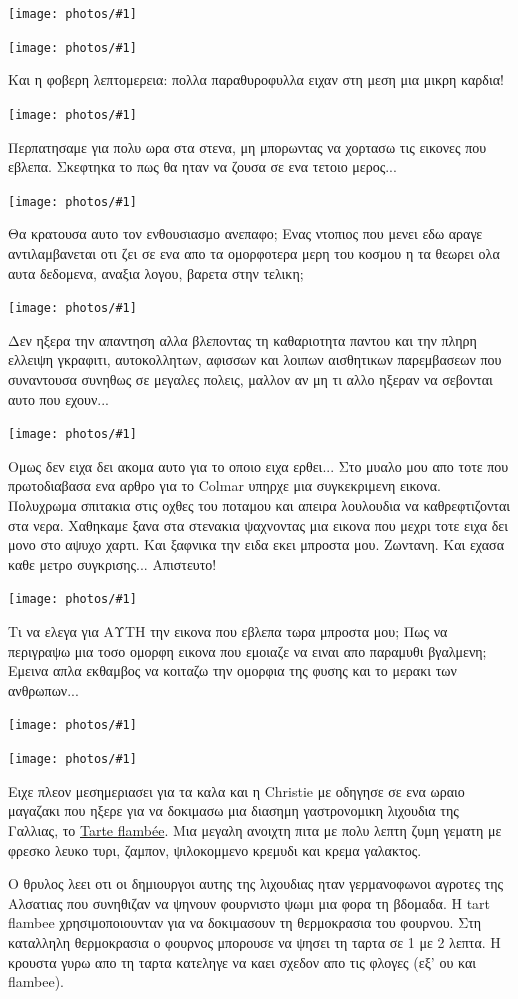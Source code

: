 \documentclass[11pt, letterpaper]{book}
\newcommand\photo[1]{\begin{center}\noindent\texttt{[image: photos/\#1]}\end{center}}
\begin{document}
\photo{103.jpg}
\photo{104.jpg}

Και η φοβερη λεπτομερεια: πολλα παραθυροφυλλα ειχαν στη μεση μια μικρη καρδια!

\photo{105.jpg}

Περπατησαμε για πολυ ωρα στα στενα, μη μπορωντας να χορτασω τις εικονες που εβλεπα. Σκεφτηκα το πως θα ηταν να ζουσα σε ενα τετοιο μερος...

\photo{106.jpg}

Θα κρατουσα αυτο τον ενθουσιασμο ανεπαφο; Ενας ντοπιος που μενει εδω αραγε αντιλαμβανεται οτι ζει σε ενα απο τα ομορφοτερα μερη του κοσμου η τα θεωρει ολα αυτα δεδομενα, αναξια λογου, βαρετα στην τελικη;

\photo{107.jpg}

Δεν ηξερα την απαντηση αλλα βλεποντας τη καθαριοτητα παντου και την πληρη ελλειψη γκραφιτι, αυτοκολλητων, αφισσων και λοιπων αισθητικων παρεμβασεων που συναντουσα συνηθως σε μεγαλες πολεις, μαλλον αν μη τι αλλο ηξεραν να σεβονται αυτο που εχουν...

\photo{108.jpg}

Ομως δεν ειχα δει ακομα αυτο για το οποιο ειχα ερθει...
Στο μυαλο μου απο τοτε που πρωτοδιαβασα ενα αρθρο για το Colmar υπηρχε μια συγκεκριμενη εικονα. Πολυχρωμα σπιτακια στις οχθες του ποταμου και απειρα λουλουδια να καθρεφτιζονται στα νερα.
Χαθηκαμε ξανα στα στενακια ψαχνοντας μια εικονα που μεχρι τοτε ειχα δει μονο στο αψυχο χαρτι.
Και ξαφνικα την ειδα εκει μπροστα μου. Ζωντανη. Και εχασα καθε μετρο συγκρισης... Απιστευτο!

\photo{109.jpg}

Τι να ελεγα για ΑΥΤΗ την εικονα που εβλεπα τωρα μπροστα μου; Πως να περιγραψω μια τοσο ομορφη εικονα που εμοιαζε να ειναι απο παραμυθι βγαλμενη;
Εμεινα απλα εκθαμβος να κοιταζω την ομορφια της φυσης και το μερακι των ανθρωπων...

\photo{110.jpg}
\photo{111.jpg}

Ειχε πλεον μεσημεριασει για τα καλα και η Christie με οδηγησε σε ενα ωραιο μαγαζακι που ηξερε για να δοκιμασω μια διασημη γαστρονομικη λιχουδια της Γαλλιας, το \href{http://en.wikipedia.org/wiki/Tarte_flamb%C3%A9e}{Tarte flambée}. Μια μεγαλη ανοιχτη πιτα με πολυ λεπτη ζυμη γεματη με φρεσκο λευκο τυρι, ζαμπον, ψιλοκομμενο κρεμυδι και κρεμα γαλακτος.

Ο θρυλος λεει οτι οι δημιουργοι αυτης της λιχουδιας ηταν γερμανοφωνοι αγροτες της Αλσατιας που συνηθιζαν να ψηνουν φουρνιστο ψωμι μια φορα τη βδομαδα. Η tart flambee χρησιμοποιουνταν για να δοκιμασουν τη θερμοκρασια του φουρνου. Στη καταλληλη θερμοκρασια ο φουρνος μπορουσε να ψησει τη ταρτα σε 1 με 2 λεπτα. Η κρουστα γυρω απο τη ταρτα κατεληγε να καει σχεδον απο τις φλογες (εξ' ου και flambee).
\end{document}
